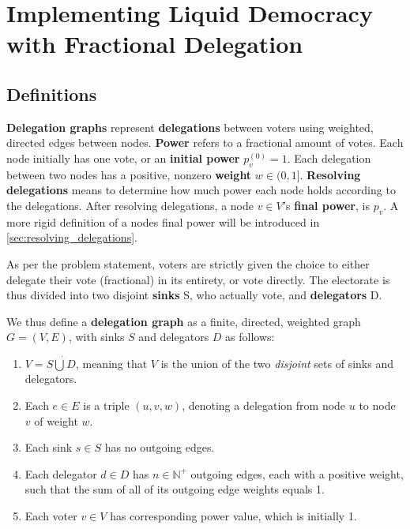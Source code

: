 \section{Implementing Liquid Democracy with Fractional Delegation}
\label{sec:ld_with_frac_del}

\subsection{Definitions}

\textbf{Delegation graphs} represent \textbf{delegations} between voters using weighted, directed edges between nodes. \textbf{Power} refers to a fractional amount of votes. Each node initially has one vote, or an \textbf{initial power} $p^{(0)}_v = 1$. Each delegation between two nodes has a positive, nonzero \textbf{weight} $w \in (0, 1] $\footnotemark. \textbf{Resolving delegations} means to determine how much power each node holds according to the delegations. After resolving delegations, a node $v \in V'$s \textbf{final power}, is $p_v$. A more rigid definition of a nodes final power will be introduced in \cref{sec:resolving_delegations}.



As per the problem statement, voters are strictly given the choice to either delegate their vote (fractional) in its entirety, or vote directly. The electorate is thus divided into two disjoint \textbf{sinks} S, who actually vote, and \textbf{delegators} D. 

We thus define a \textbf{delegation graph} as a finite, directed, weighted graph $G = (V, E)$, with sinks $S$ and delegators $D$ as follows:

\begin{enumerate}
\item $V = S \dot\bigcup D$, meaning that $V$ is the union of the two \textit{disjoint} sets of sinks and delegators.
\item Each $e \in E$ is a triple $(u, v, w)$, denoting a delegation from node $u$ to node $v$ of weight $w$.
\item Each sink $s \in S$ has no outgoing edges.
\item Each delegator $d \in D$ has $n \in \mathbb{N}^+$ outgoing edges, each with a positive weight, such that the sum of all of its outgoing edge weights equals 1.
\item Each voter $v \in V$ has corresponding power value, which is initially 1.
\end{enumerate}

